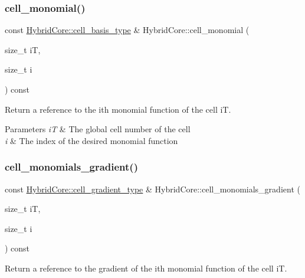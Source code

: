 \subsubsection{\texorpdfstring{cell\+\_\+monomial()}{cell\_monomial()}}
{\footnotesize\ttfamily const \hyperlink{classHArDCore3D_1_1HybridCore_a9e760b418a3948b34114879f37086829}{Hybrid\+Core\+::cell\+\_\+basis\+\_\+type} \& Hybrid\+Core\+::cell\+\_\+monomial (\begin{DoxyParamCaption}\item[{size\+\_\+t}]{iT,  }\item[{size\+\_\+t}]{i }\end{DoxyParamCaption}) const}



Return a reference to the i\textquotesingle{}th monomial function of the cell iT. 


\begin{DoxyParams}{Parameters}
{\em iT} & The global cell number of the cell \\
\hline
{\em i} & The index of the desired monomial function \\
\hline
\end{DoxyParams}
\mbox{\label{classHArDCore3D_1_1HybridCore_a0edb2fb02577f68744abb8a436381cf7}} 
\subsubsection{\texorpdfstring{cell\+\_\+monomials\+\_\+gradient()}{cell\_monomials\_gradient()}}
{\footnotesize\ttfamily const \hyperlink{classHArDCore3D_1_1HybridCore_ad4dd9ca67d6de59d7ea71c816d3d3e67}{Hybrid\+Core\+::cell\+\_\+gradient\+\_\+type} \& Hybrid\+Core\+::cell\+\_\+monomials\+\_\+gradient (\begin{DoxyParamCaption}\item[{size\+\_\+t}]{iT,  }\item[{size\+\_\+t}]{i }\end{DoxyParamCaption}) const}



Return a reference to the gradient of the i\textquotesingle{}th monomial function of the cell iT. 

